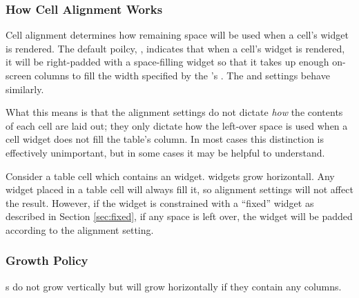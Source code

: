 \subsubsection{How Cell Alignment Works}

Cell alignment determines how remaining space will be used when a
cell's widget is rendered.  The default poilcy, ,
indicates that when a cell's widget is rendered, it will be
right-padded with a space-filling widget so that it takes up enough
on-screen columns to fill the width specified by the 's
.  The  and  settings
behave similarly.

What this means is that the alignment settings do not dictate
\textit{how} the contents of each cell are laid out; they only dictate
how the left-over space is used when a cell widget does not fill the
table's column.  In most cases this distinction is effectively
unimportant, but in some cases it may be helpful to understand.

Consider a table cell which contains an  widget.  
widgets grow horizontall.  Any  widget placed in a table cell
will always fill it, so alignment settings will not affect the result.
However, if the  widget is constrained with a ``fixed''
widget as described in Section \ref{sec:fixed}, if any space is left
over, the widget will be padded according to the alignment setting.

\subsubsection{Growth Policy}

s do not grow vertically but will grow horizontally if they
contain any  columns.
